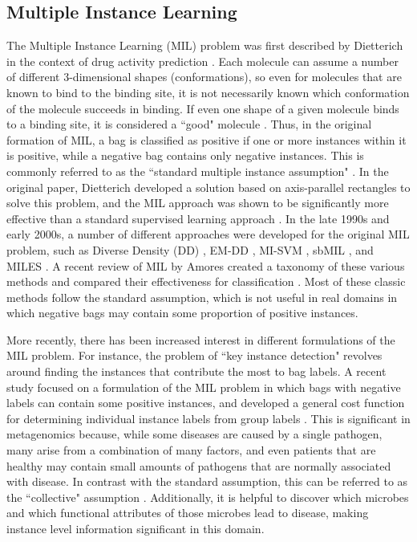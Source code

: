 
\subsection{Multiple Instance Learning}

The Multiple Instance Learning (MIL) problem was first described by Dietterich in the context of drug activity prediction \cite{dietterich97}. 
Each molecule can assume a number of different 3-dimensional shapes (conformations), so even for molecules that are known to bind to the binding site, it is not necessarily known which conformation of the molecule succeeds in binding. If even one shape of a given molecule binds to a binding site, it is considered a ``good" molecule \cite{dietterich97}. Thus, in the original formation of MIL, a bag is classified as positive if one or more instances within it is positive, while a negative bag contains only negative instances. This is commonly referred to as the ``standard multiple instance assumption" \cite{amores13}. In the original paper, Dietterich developed a solution based on axis-parallel rectangles to solve this problem, and the MIL approach was shown to be significantly more effective than a standard supervised learning approach \cite{dietterich97}. In the late 1990s and early 2000s, a number of different approaches were developed for the original MIL problem, such as Diverse Density (DD) \cite{perez98}, EM-DD \cite{zhang01}, MI-SVM \cite{andrews02}, sbMIL \cite{bunescu07}, and MILES \cite{wang06}. A recent review of MIL by Amores created a taxonomy of these various methods and compared their effectiveness for classification \cite{amores13}. Most of these classic methods follow the standard assumption, which is not useful in real domains in which negative bags may contain some proportion of positive instances.
%

More recently, there has been increased interest in different formulations of the MIL problem. For instance, the problem of ``key instance detection" \cite{zhou12} revolves around finding the instances that contribute the most to bag labels. A recent study focused on a formulation of the MIL problem in which bags with negative labels can contain some positive instances, and developed a general cost function for determining individual instance labels from group labels \cite{kotzias15}. This is significant in metagenomics because, while some diseases are caused by a single pathogen, many arise from a combination of many factors, and even patients that are healthy may contain small amounts of pathogens that are normally associated with disease. In contrast with the standard assumption, this can be referred to as the ``collective" assumption \cite{amores13}. Additionally, it is helpful to discover which microbes and which functional attributes of those microbes lead to disease, making instance level information significant in this domain.
%

